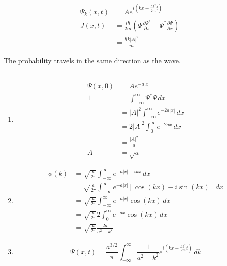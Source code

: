 \documentclass{article}
\begin{document}
\subsection{}

\begin{align*}
  \Psi_k(x, t) & = A e^{i \left( k x - \frac{\hbar k^2}{2 m} t \right)}                                                                 \\
  J(x, t)      & = \frac{i \hbar}{2 m} \left( \Psi \frac{\partial \Psi^*}{\partial x} - \Psi^* \frac{\partial \Psi}{\partial x} \right) \\
               & = \frac{\hbar k |A|^2}{m}
\end{align*}

The probability travels in the same direction as the wave.

\setcounter{subsection}{19}
\subsection{}

\begin{enumerate}
  \item

        \begin{align*}
          \Psi(x, 0) & = A e^{-a |x|}                                   \\
          1          & = \int_{-\infty}^\infty \Psi^* \Psi \,d x        \\
                     & = |A|^2 \int_{-\infty}^\infty e^{-2 a |x|} \,d x \\
                     & = 2 |A|^2 \int_0^\infty e^{-2 a x} \,d x         \\
                     & = \frac{|A|^2}{a}                                \\
          A          & = \sqrt{a}
        \end{align*}

  \item

        \begin{align*}
          \phi(k) & = \sqrt{\frac{a}{2 \pi}} \int_{-\infty}^\infty e^{-a |x| - i k x} \,d x                     \\
                  & = \sqrt{\frac{a}{2 \pi}} \int_{-\infty}^\infty e^{-a |x|} [\cos (k x) - i \sin (k x)] \,d x \\
                  & = \sqrt{\frac{a}{2 \pi}} \int_{-\infty}^\infty e^{-a |x|} \cos (k x) \,d x                  \\
                  & = \sqrt{\frac{a}{2 \pi}} 2 \int_0^\infty e^{-a x} \cos (k x) \,d x                          \\
                  & = \sqrt{\frac{a}{2 \pi}} \frac{2 a}{a^2 + k^2}
        \end{align*}

  \item \[\Psi(x, t) = \frac{a^{3 / 2}}{\pi} \int_{-\infty}^\infty \frac{1}{a^2 + k^2} e^{i \left( k x - \frac{\hbar k^2}{2 m} t \right)} \,d k\]
\end{enumerate}
\end{document}
